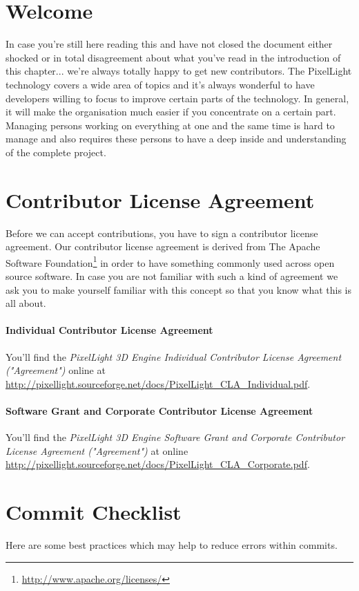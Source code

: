 \section{Welcome}
In case you're still here reading this and have not closed the document either shocked or in total disagreement about what you've read in the introduction of this chapter... we're always totally happy to get new contributors. The PixelLight technology covers a wide area of topics and it's always wonderful to have developers willing to focus to improve certain parts of the technology. In general, it will make the organisation much easier if you concentrate on a certain part. Managing persons working on everything at one and the same time is hard to manage and also requires these persons to have a deep inside and understanding of the complete project.




\section{Contributor License Agreement}
Before we can accept contributions, you have to sign a contributor license agreement. Our contributor license agreement is derived from The Apache Software Foundation\footnote{\url{http://www.apache.org/licenses/}} in order to have something commonly used across open source software. In case you are not familiar with such a kind of agreement we ask you to make yourself familiar with this concept so that you know what this is all about.


\paragraph{Individual Contributor License Agreement}
You'll find the \emph{PixelLight 3D Engine Individual Contributor License Agreement ("Agreement")} online at \url{http://pixellight.sourceforge.net/docs/PixelLight_CLA_Individual.pdf}.


\paragraph{Software Grant and Corporate Contributor License Agreement}
You'll find the \emph{PixelLight 3D Engine Software Grant and Corporate Contributor License Agreement ("Agreement")} at online  \url{http://pixellight.sourceforge.net/docs/PixelLight_CLA_Corporate.pdf}.




\section{Commit Checklist}
Here are some best practices which may help to reduce errors within commits.

